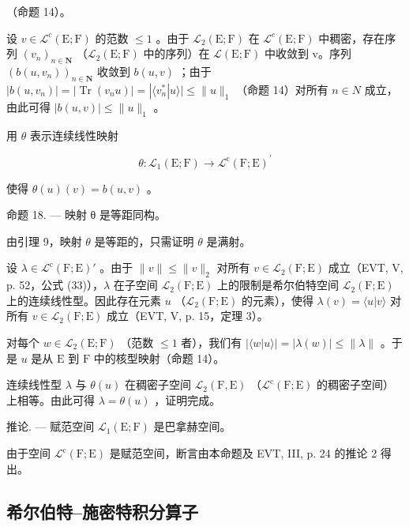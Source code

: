 （命题 14）。

设 \(v \in \mathcal{L}^{c}(\mathrm{E};\mathrm{F})\) 的范数 \(\leqslant 1\) 。由于 \(\mathcal{L}_{2}(\mathrm{E};\mathrm{F})\) 在 \(\mathcal{L}^{c}(\mathrm{E};\mathrm{F})\) 中稠密，存在序列 \((v_{n})_{n\in\mathbf{N}}\) （\(\mathcal{L}_{2}(\mathrm{E};\mathrm{F})\) 中的序列）在 \(\mathcal{L}(\mathrm{E};\mathrm{F})\) 中收敛到 v。序列 \((b(u,v_{n}))_{n\in\mathbf{N}}\) 收敛到 \(b(u,v)\) ；由于 \(|b(u,v_{n})| = |\operatorname{Tr}(v_{n}u)| = |\langle v_{n}^{*}|u\rangle| \leqslant \|u\|_{1}\) （命题 14）对所有 \(n \in N\) 成立，由此可得 \(|b(u,v)| \leqslant \|u\|_{1}\) 。

用 \(\theta\) 表示连续线性映射

\[
\theta \colon \mathcal {L} _ {1} (\mathrm{E}; \mathrm{F}) \to \mathcal {L} ^ {\mathrm{c}} (\mathrm{F}; \mathrm{E}) ^ {\prime}
\]

使得 \(\theta(u)(v) = b(u,v)\) 。

命题 18. --- 映射 θ 是等距同构。

由引理 9，映射 \(\theta\) 是等距的，只需证明 \(\theta\) 是满射。

设 \(\lambda \in \mathcal{L}^{\mathrm{c}}(\mathrm{F};\mathrm{E})'\) 。由于 \(\| v\| \leqslant \| v\|_{2}\) 对所有 \(v\in \mathcal{L}_2(\mathrm{F};\mathrm{E})\) 成立（EVT, V, p. 52，公式 (33)），\(\lambda\) 在子空间 \(\mathcal{L}_2(\mathrm{F};\mathrm{E})\) 上的限制是希尔伯特空间 \(\mathcal{L}_2(\mathrm{F};\mathrm{E})\) 上的连续线性型。因此存在元素 \(u\) （\(\mathcal{L}_2(\mathrm{F};\mathrm{E})\) 的元素），使得 \(\lambda (v) = \langle u|v\rangle\) 对所有 \(v\in \mathcal{L}_2(\mathrm{F};\mathrm{E})\) 成立（EVT, V, p. 15，定理 3）。

对每个 \(w \in \mathcal{L}_2(\mathrm{E};\mathrm{F})\) （范数 \(\leqslant 1\) 者），我们有 \(|\langle w|u\rangle| = |\lambda(w)| \leqslant \| \lambda \|\) 。于是 \(u\) 是从 \(\mathrm{E}\) 到 \(\mathrm{F}\) 中的核型映射（命题 14）。

连续线性型 \(\lambda\) 与 \(\theta(u)\) 在稠密子空间 \(\mathcal{L}_{2}(\mathrm{F},\mathrm{E})\) （\(\mathcal{L}^{\mathrm{c}}(\mathrm{F};\mathrm{E})\) 的稠密子空间）上相等。由此可得 \(\lambda=\theta(u)\) ，证明完成。

推论. --- 赋范空间 \(\mathcal{L}_{1}(\mathrm{E};\mathrm{F})\) 是巴拿赫空间。

由于空间 \(\mathcal{L}^{\mathrm{c}}(\mathrm{F};\mathrm{E})\) 是赋范空间，断言由本命题及 EVT, III, p. 24 的推论 2 得出。

\subsection{希尔伯特--施密特积分算子}

